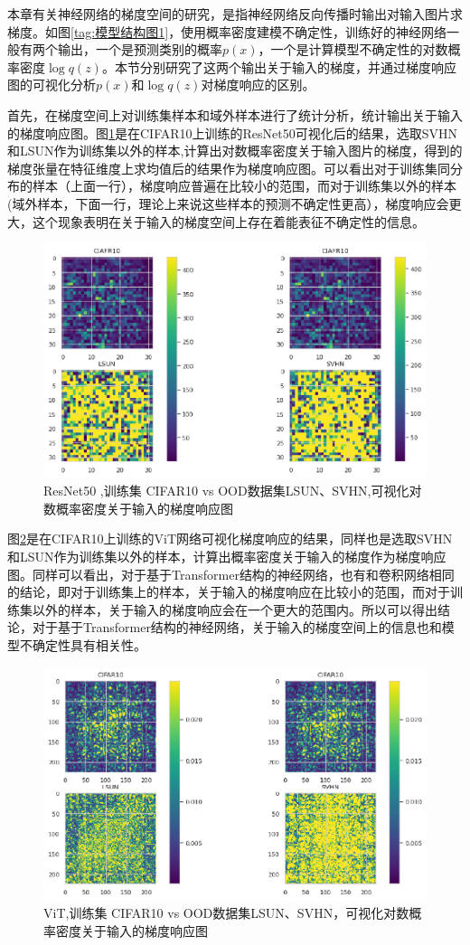 本章有关神经网络的梯度空间的研究，是指神经网络反向传播时输出对输入图片求梯度。如图\ref{tag:模型结构图1}，使用概率密度建模不确定性，训练好的神经网络一般有两个输出，一个是预测类别的概率$p(x)$，一个是计算模型不确定性的对数概率密度$\log q(z)$。本节分别研究了这两个输出关于输入的梯度，并通过梯度响应图的可视化分析$p(x)$和$\log q(z)$对梯度响应的区别。

首先，在梯度空间上对训练集样本和域外样本进行了统计分析，统计输出关于输入的梯度响应图。图\ref{fig:resp1}是在CIFAR10上训练的ResNet50可视化后的结果，选取SVHN和LSUN作为训练集以外的样本,计算出对数概率密度关于输入图片的梯度，得到的梯度张量在特征维度上求均值后的结果作为梯度响应图。可以看出对于训练集同分布的样本（上面一行），梯度响应普遍在比较小的范围，而对于训练集以外的样本(域外样本，下面一行，理论上来说这些样本的预测不确定性更高），梯度响应会更大，这个现象表明在关于输入的梯度空间上存在着能表征不确定性的信息。
\begin{figure}[h]
    \captionsetup{font=small, justification=centering}
    \centering
    \includegraphics[width=0.75\linewidth]{assets/3-1.png}
    \caption{ResNet50 ,训练集 CIFAR10 vs OOD数据集LSUN、SVHN,可视化对数概率密度关于输入的梯度响应图
}
    \label{fig:resp1}
\end{figure}

图\ref{fig:resp2}是在CIFAR10上训练的ViT网络可视化梯度响应的结果，同样也是选取SVHN和LSUN作为训练集以外的样本，计算出概率密度关于输入的梯度作为梯度响应图。同样可以看出，对于基于Transformer\cite{vaswani2017attention}结构的神经网络，也有和卷积网络相同的结论，即对于训练集上的样本，关于输入的梯度响应在比较小的范围，而对于训练集以外的样本，关于输入的梯度响应会在一个更大的范围内。所以可以得出结论，对于基于Transformer结构的神经网络，关于输入的梯度空间上的信息也和模型不确定性具有相关性。
\begin{figure}[h]
    \captionsetup{font=small, justification=centering}
    \centering
    \includegraphics[width=0.75\linewidth]{assets/3-2.png}
    \caption{ViT,训练集 CIFAR10 vs OOD数据集LSUN、SVHN，可视化对数概率密度关于输入的梯度响应图
}
    \label{fig:resp2}
\end{figure}

